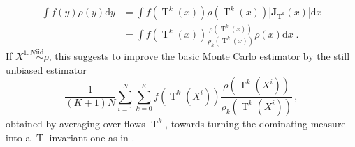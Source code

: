\documentclass{article}
\def\simiid{\overset{\operatorname{iid}}{\sim}}
\def\transfo{\operatorname{T}}
\def\rmd{\operatorname{d}\hspace{-2pt}}
\def\rmd{\mathrm{d}}
\def\eqsp{\,}
\def\eqsp{\;}
\newcommand{\1}{\mathds{1}}
\def\Jac{\mathbf{J}}
\newcommand{\JacOp}[1]{\Jac_{#1}}
\def\rmd{\mathrm{d}}
\begin{document}
\begin{align*}
\int f(y) \rho(y) \rmd y &=
\int f(\transfo^{k}(x)) \rho(\transfo^{k}(x)) |\JacOp{\transfo^{k}}(x)|\rmd x
\\
&=
\int f(\transfo^{k}(x)) \frac{\rho(\transfo^{k}(x))}{\rho_k(\transfo^{k}(x))} \rho(x) \rmd x \eqsp.
\end{align*}
If $X^{1:N}\simiid\rho$, this suggests to improve the basic Monte Carlo estimator by the still unbiased estimator
\begin{equation}\label{eq:multimpo}
\frac{1}{(K+1)N}\sum_{i=1}^N\sum_{k=0}^K f(\transfo^{k}(X^i))\frac{\rho(\transfo^{k}(X^i))}{
\rho_k(\transfo^{k}(X^i))}\,,
\end{equation}
obtained by averaging over flows $\transfo^k$, towards turning the dominating measure into a $\transfo$ invariant one as in \cite{kong:etal:2003}.
\end{document}
